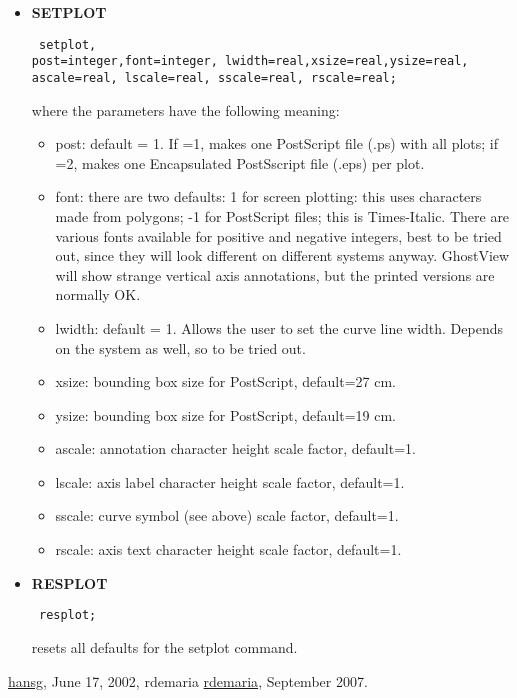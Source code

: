 \begin{itemize}
	\item \textbf{SETPLOT}
\begin{verbatim}
 setplot,
post=integer,font=integer, lwidth=real,xsize=real,ysize=real,
ascale=real, lscale=real, sscale=real, rscale=real; \end{verbatim} where the parameters have the following meaning: 
\begin{itemize}
	\item post: default = 1. If =1, makes one PostScript file (.ps) with all plots; if =2, makes one Encapsulated PostSscript file (.eps) per plot.  
	\item font: there are two defaults: 1 for screen plotting: this uses characters made from polygons; -1 for PostScript files; this is Times-Italic. There are various fonts available for positive and negative integers, best to be tried out, since they will look different on different systems anyway. GhostView will show strange vertical axis annotations, but the printed versions are normally OK.  
	\item lwidth: default = 1. Allows the user to set the curve line width.  Depends on the system as well, so to be tried out.  
	\item xsize: bounding box size for PostScript, default=27 cm.  
	\item ysize: bounding box size for PostScript, default=19 cm.  
	\item ascale: annotation character height scale factor, default=1.  
	\item lscale: axis label character height scale factor, default=1.  
	\item sscale: curve symbol (see above) scale factor, default=1.  
	\item rscale: axis text character height scale factor, default=1.  
\end{itemize}


	\item \textbf{RESPLOT}
\begin{verbatim}
 resplot; \end{verbatim} resets all defaults for the setplot command.  
\end{itemize}\href{http://www.cern.ch/Hans.Grote/hansg_sign.html}{hansg}, June 17, 2002, rdemaria \href{http://cern.ch/rdemaria}{rdemaria}, September 2007. 

